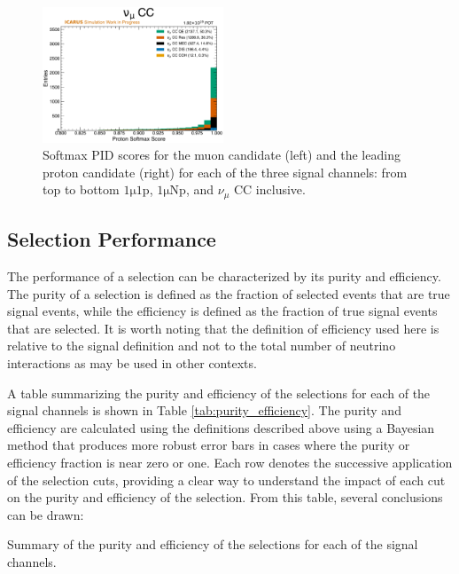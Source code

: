 \begin{figure}[!htb]
    \includegraphics[width=0.48\textwidth]{figures/neutrino_selection/signal_hist1d_1muX_proton_softmax.pdf}
    \caption{Softmax PID scores for the muon candidate (left) and the leading proton candidate (right) for each of the three signal channels: from top to bottom $\mathrm{1\mu 1p}$, $\mathrm{1\mu Np}$, and $\nu_\mu$ CC inclusive.}
    \label{fig:softmax_pid}
\end{figure}

\subsection{Selection Performance}
\label{sec:selection_performance}

The performance of a selection can be characterized by its purity and efficiency. The purity of a selection is defined as the fraction of selected events that are true signal events, while the efficiency is defined as the fraction of true signal events that are selected. It is worth noting that the definition of efficiency used here is relative to the signal definition and not to the total number of neutrino interactions as may be used in other contexts. 

A table summarizing the purity and efficiency of the selections for each of the signal channels is shown in Table \ref{tab:purity_efficiency}. The purity and efficiency are calculated using the definitions described above using a Bayesian method \cite{Casadei2012} that produces more robust error bars in cases where the purity or efficiency fraction is near zero or one. Each row denotes the successive application of the selection cuts, providing a clear way to understand the impact of each cut on the purity and efficiency of the selection. From this table, several conclusions can be drawn:

\begin{table}
    \centering
    \caption{Summary of the purity and efficiency of the selections for each of the signal channels.}
    \resizebox{0.99\textwidth}{!}{}
    \label{tab:purity_efficiency}
\end{table}

